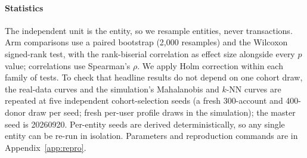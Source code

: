 \paragraph{Statistics}
The independent unit is the entity, so we resample entities, never transactions. Arm comparisons use a paired bootstrap (2{,}000 resamples) and the Wilcoxon signed-rank test, with the rank-biserial correlation as effect size alongside every $p$ value; correlations use Spearman's $\rho$. We apply Holm correction within each family of tests. To check that headline results do not depend on one cohort draw, the real-data curves and the simulation's Mahalanobis and $k$-NN curves are repeated at five independent cohort-selection seeds (a fresh 300-account and 400-donor draw per seed; fresh per-user profile draws in the simulation); the master seed is 20260920. Per-entity seeds are derived deterministically, so any single entity can be re-run in isolation. Parameters and reproduction commands are in Appendix~\ref{app:repro}.
